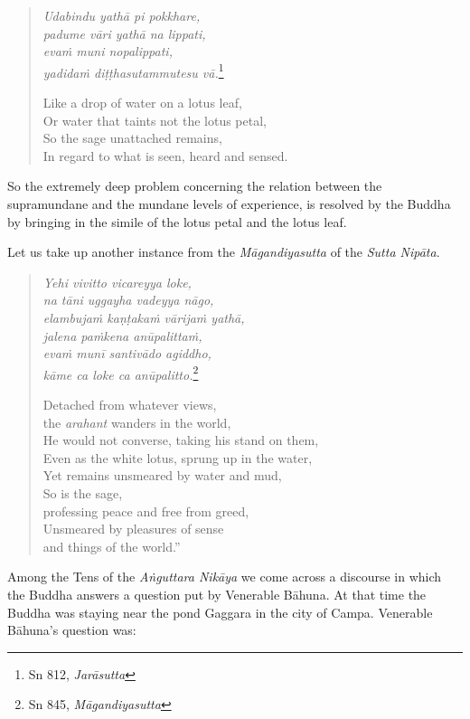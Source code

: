 \begin{quote}
\emph{Udabindu yathā pi pokkhare,}\\
\emph{padume vāri yathā na lippati,}\\
\emph{evaṁ muni nopalippati,}\\
\emph{yadidaṁ diṭṭhasutammutesu vā.}\footnote{Sn 812, \emph{Jarāsutta}}

Like a drop of water on a lotus leaf,\\
Or water that taints not the lotus petal,\\
So the sage unattached remains,\\
In regard to what is seen, heard and sensed.
\end{quote}

So the extremely deep problem concerning the relation between the supramundane and the mundane levels of experience, is resolved by the Buddha by bringing in the simile of the lotus petal and the lotus leaf.

Let us take up another instance from the \emph{Māgandiyasutta} of the \emph{Sutta Nipāta}.

\begin{quote}
\emph{Yehi vivitto vicareyya loke,}\\
\emph{na tāni uggayha vadeyya nāgo,}\\
\emph{elambujaṁ kaṇṭakaṁ vārijaṁ yathā,}\\
\emph{jalena paṁkena anūpalittaṁ,}\\
\emph{evaṁ munī santivādo agiddho,}\\
\emph{kāme ca loke ca anūpalitto.}\footnote{Sn 845, \emph{Māgandiyasutta}}

Detached from whatever views,\\
\vin the \emph{arahant} wanders in the world,\\
He would not converse, taking his stand on them,\\
Even as the white lotus, sprung up in the water,\\
Yet remains unsmeared by water and mud,\\
So is the sage,\\
\vin professing peace and free from greed,\\
Unsmeared by pleasures of sense\\
\vin and things of the world.''
\end{quote}

Among the Tens of the \emph{Aṅguttara Nikāya} we come across a discourse in which the Buddha answers a question put by Venerable Bāhuna. At that time the Buddha was staying near the pond Gaggara in the city of Campa. Venerable Bāhuna's question was:

